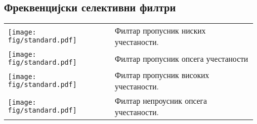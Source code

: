 \subsection*{Фреквенцијски селективни филтри}

\noindent
\begin{tabular}{ll}    
    \begin{minipage}{0.1\textwidth}
        \texttt{[image: fig/standard.pdf]}     
    \end{minipage}
    & 
    \begin{minipage}{0.8\textwidth}
        Филтар пропусник ниских учестаности. 
    \end{minipage}
    \\[5mm]
    \begin{minipage}{0.1\textwidth}
        \texttt{[image: fig/standard.pdf]}     
    \end{minipage}
    & 
    \begin{minipage}{0.8\textwidth}
        Филтар пропусник опсега учестаности
    \end{minipage}
    \\[5mm]
    \begin{minipage}{0.1\textwidth}
        \texttt{[image: fig/standard.pdf]}     
    \end{minipage}
    & 
    \begin{minipage}{0.8\textwidth}
        Филтар пропусник високих учестаности. 
    \end{minipage}
    \\[5mm]
    \begin{minipage}{0.1\textwidth}
        \texttt{[image: fig/standard.pdf]}     
    \end{minipage}
    & 
    \begin{minipage}{0.8\textwidth}
        Филтар непроусник опсега учестаности.
    \end{minipage}
\end{tabular}

